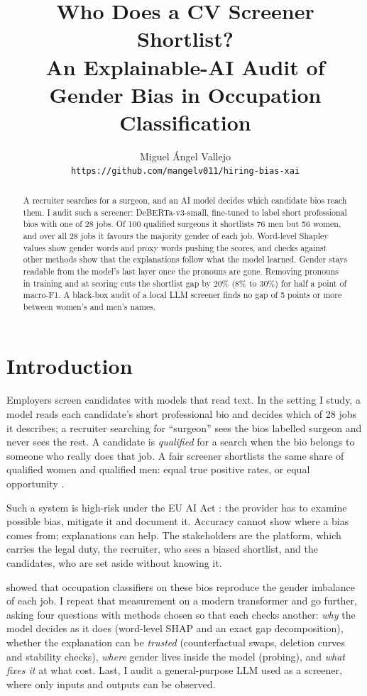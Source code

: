 \documentclass[11pt]{article}
\title{Who Does a CV Screener Shortlist?\\
An Explainable-AI Audit of Gender Bias in Occupation Classification}
\author{Miguel Ángel Vallejo \\
  \texttt{https://github.com/mangelv011/hiring-bias-xai}}
\begin{document}
\maketitle

\begin{abstract}
A recruiter searches for a surgeon, and an AI model decides which candidate bios reach them. I audit such a screener: DeBERTa-v3-small, fine-tuned to label short professional bios with one of 28 jobs. Of 100 qualified surgeons it shortlists 76 men but 56 women, and over all 28 jobs it favours the majority gender of each job. Word-level Shapley values show gender words and proxy words pushing the scores, and checks against other methods show that the explanations follow what the model learned. Gender stays readable from the model's last layer once the pronouns are gone. Removing pronouns in training and at scoring cuts the shortlist gap by 20\% (8\% to 30\%) for half a point of macro-F1. A black-box audit of a local LLM screener finds no gap of 5 points or more between women's and men's names.
\end{abstract}

\section{Introduction}

Employers screen candidates with models that read text. In the setting I study, a model reads each candidate's short professional bio and decides which of 28 jobs it describes; a recruiter searching for ``surgeon'' sees the bios labelled surgeon and never sees the rest. A candidate is \emph{qualified} for a search when the bio belongs to someone who really does that job. A fair screener shortlists the same share of qualified women and qualified men: equal true positive rates, or equal opportunity \citep{hardt2016equality}.

Such a system is high-risk under the EU AI Act \citep[Annex III]{euaiact2024}: the provider has to examine possible bias, mitigate it and document it. Accuracy cannot show where a bias comes from; explanations can help. The stakeholders are the platform, which carries the legal duty, the recruiter, who sees a biased shortlist, and the candidates, who are set aside without knowing it.

\citet{dearteaga2019bias} showed that occupation classifiers on these bios reproduce the gender imbalance of each job. I repeat that measurement on a modern transformer and go further, asking four questions with methods chosen so that each checks another: \emph{why} the model decides as it does (word-level SHAP and an exact gap decomposition), whether the explanation can be \emph{trusted} (counterfactual swaps, deletion curves and stability checks), \emph{where} gender lives inside the model (probing), and \emph{what fixes it} at what cost. Last, I audit a general-purpose LLM used as a screener, where only inputs and outputs can be observed.
\end{document}
